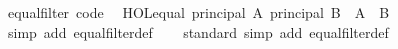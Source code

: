 \begin{isabellebody}
\isanewline
{}\isamarkupfalse%
\ equal{\isacharunderscore}{\kern0pt}filter\ {\isacharbrackleft}{\kern0pt}code{\isacharbrackright}{\kern0pt}{\isacharcolon}{\kern0pt}\isanewline
\ \ {\isachardoublequoteopen}HOL{\isachardot}{\kern0pt}equal\ {\isacharparenleft}{\kern0pt}principal\ A{\isacharparenright}{\kern0pt}\ {\isacharparenleft}{\kern0pt}principal\ B{\isacharparenright}{\kern0pt}\ {\isasymlongleftrightarrow}\ A\ {\isacharequal}{\kern0pt}\ B{\isachardoublequoteclose}\isanewline
%
\isadelimproof
\ \ %
\endisadelimproof
%
\isatagproof
{}\isamarkupfalse%
\ {\isacharparenleft}{\kern0pt}simp\ add{\isacharcolon}{\kern0pt}\ equal{\isacharunderscore}{\kern0pt}filter{\isacharunderscore}{\kern0pt}def{\isacharparenright}{\kern0pt}%
\endisatagproof
{\isafoldproof}%
%
\isadelimproof
\isanewline
%
\endisadelimproof
\isanewline
{}\isamarkupfalse%
\isanewline
%
\isadelimproof
\ \ %
\endisadelimproof
%
\isatagproof
{}\isamarkupfalse%
\ standard\ {\isacharparenleft}{\kern0pt}simp\ add{\isacharcolon}{\kern0pt}\ equal{\isacharunderscore}{\kern0pt}filter{\isacharunderscore}{\kern0pt}def{\isacharparenright}{\kern0pt}%
\endisatagproof
{\isafoldproof}%
%
\isadelimproof
\isanewline
%
\endisadelimproof
\isanewline
{}\isamarkupfalse%
\isanewline
%
\isadelimtheory
\isanewline
%
\endisadelimtheory
%
\isatagtheory
{}\isamarkupfalse%
%
\endisatagtheory
{\isafoldtheory}%
%
\isadelimtheory
%
\endisadelimtheory
%
\end{isabellebody}%
\endinput
